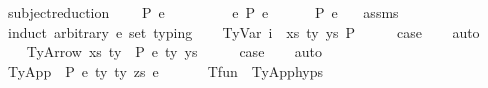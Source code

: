 \begin{isabellebody}
\begin{isamarkuptext}
\end{isamarkuptext}\isamarkuptrue%
\isamarkupfalse%
\ subject{\isacharunderscore}{\kern0pt}reduction{\isacharcolon}{\kern0pt}\isanewline
\ \ \ {\isachardoublequoteopen}{\isasymGamma}\ {\isasymturnstile}{\isacharbraceleft}{\kern0pt}P{\isacharbraceright}{\kern0pt}\ e\ {\isacharcolon}{\kern0pt}\ {\isasymtau}{\isachardoublequoteclose}\isanewline
\ \ \ \ \ \ \ {\isachardoublequoteopen}e\ {\isacharminus}{\kern0pt}{\isachargreater}{\kern0pt}{\isacharbraceleft}{\kern0pt}P{\isacharbraceright}{\kern0pt}\ e{\isacharprime}{\kern0pt}{\isachardoublequoteclose}\isanewline
\ \ \ \ \ {\isachardoublequoteopen}{\isasymGamma}\ {\isasymturnstile}{\isacharbraceleft}{\kern0pt}P{\isacharbraceright}{\kern0pt}\ e{\isacharprime}{\kern0pt}\ {\isacharcolon}{\kern0pt}\ {\isasymtau}{\isachardoublequoteclose}\isanewline
%
\isadelimproof
%
\endisadelimproof
%
\isatagproof
{}\isamarkupfalse%
\ assms\isanewline
{}\isamarkupfalse%
\ {\isacharparenleft}{\kern0pt}induct\ arbitrary{\isacharcolon}{\kern0pt}\ e{\isacharprime}{\kern0pt}\ set{\isacharcolon}{\kern0pt}\ typing{\isacharparenright}{\kern0pt}\isanewline
\ \ \isamarkupfalse%
\ {\isacharparenleft}{\kern0pt}TyVar\ i\ {\isasymGamma}\ xs\ ty\ ys\ P{\isacharparenright}{\kern0pt}\isanewline
\ \ \isamarkupfalse%
\ \isamarkupfalse%
\ {\isacharquery}{\kern0pt}case\isanewline
\ \ \isamarkupfalse%
\ auto\isanewline
\ \ \isamarkupfalse%
\isanewline
{}\isamarkupfalse%
\isanewline
\ \ \isamarkupfalse%
\ {\isacharparenleft}{\kern0pt}TyArrow\ xs\ ty{}\ {\isasymGamma}\ P\ e\ ty{}\ ys{\isacharparenright}{\kern0pt}\isanewline
\ \ \isamarkupfalse%
\ \isamarkupfalse%
\ {\isacharquery}{\kern0pt}case\isanewline
\ \ \isamarkupfalse%
\ auto\isanewline
\ \ \isamarkupfalse%
\isanewline
{}\isamarkupfalse%
\isanewline
\ \ \isamarkupfalse%
\ {\isacharparenleft}{\kern0pt}TyApp\ {\isasymGamma}\ P\ e{}\ ty{}\ ty{}\ zs\ e{}{\isacharparenright}{\kern0pt}\isanewline
\ \ \isanewline
\ \ \isamarkupfalse%
\ T{\isacharunderscore}{\kern0pt}fun\ {\isacharequal}{\kern0pt}\ TyApp{\isachardot}{\kern0pt}hyps{\isacharparenleft}{\kern0pt}{}{\isacharparenright}{\kern0pt}\ \ \ \isanewline

\end{isabellebody}
